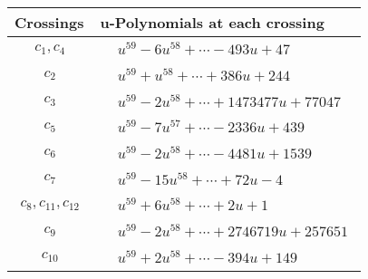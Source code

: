 \documentclass[1p]{elsarticle_modified}
\theoremstyle{definition}
\begin{document}
\begin{tabular}{m{50pt}|m{274pt}}
Crossings & \hspace{64pt}u-Polynomials at each crossing \\
\hline $$\begin{aligned}c_{1},c_{4}\end{aligned}$$&$\begin{aligned}
&u^{59}-6 u^{58}+\cdots-493 u+47
\end{aligned}$\\
\hline $$\begin{aligned}c_{2}\end{aligned}$$&$\begin{aligned}
&u^{59}+u^{58}+\cdots+386 u+244
\end{aligned}$\\
\hline $$\begin{aligned}c_{3}\end{aligned}$$&$\begin{aligned}
&u^{59}-2 u^{58}+\cdots+1473477 u+77047
\end{aligned}$\\
\hline $$\begin{aligned}c_{5}\end{aligned}$$&$\begin{aligned}
&u^{59}-7 u^{57}+\cdots-2336 u+439
\end{aligned}$\\
\hline $$\begin{aligned}c_{6}\end{aligned}$$&$\begin{aligned}
&u^{59}-2 u^{58}+\cdots-4481 u+1539
\end{aligned}$\\
\hline $$\begin{aligned}c_{7}\end{aligned}$$&$\begin{aligned}
&u^{59}-15 u^{58}+\cdots+72 u-4
\end{aligned}$\\
\hline $$\begin{aligned}c_{8},c_{11},c_{12}\end{aligned}$$&$\begin{aligned}
&u^{59}+6 u^{58}+\cdots+2 u+1
\end{aligned}$\\
\hline $$\begin{aligned}c_{9}\end{aligned}$$&$\begin{aligned}
&u^{59}-2 u^{58}+\cdots+2746719 u+257651
\end{aligned}$\\
\hline $$\begin{aligned}c_{10}\end{aligned}$$&$\begin{aligned}
&u^{59}+2 u^{58}+\cdots-394 u+149
\end{aligned}$\\
\hline
\end{tabular}\\~\\
\end{document}
